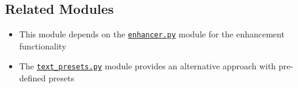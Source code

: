 \subsection{Related Modules}
\begin{itemize}
    \item This module depends on the \hyperref[sec:enhancer]{\texttt{enhancer.py}} module for the enhancement functionality
    \item The \hyperref[sec:text_presets]{\texttt{text\_presets.py}} module provides an alternative approach with pre-defined presets
\end{itemize} 